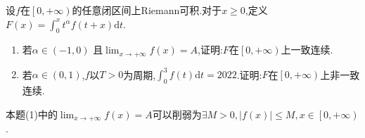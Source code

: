 \documentclass[lang=cn,newtx,10pt,scheme=chinese]{../Template/elegantbook}
\begin{document}
\begin{example}
设$f$在$\left[ 0,+\infty \right)$的任意闭区间上Riemann可积.对于$x\geqslant 0$,定义$F\left( x \right) =\int_0^x{t^{\alpha}}f\left( t+x \right) \mathrm{d}t$.
\begin{enumerate}[(1)]
\item 若$\alpha \in \left( -1,0 \right)$ 且$\lim_{x\rightarrow +\infty} f\left( x \right) =A$,证明:$F$在$\left[ 0,+\infty \right) $上一致连续.

\item 若$\alpha \in \left( 0,1 \right)$,$f$以$T>0$为周期,$\int_0^3{f\left( t \right) \mathrm{d}t}=2022$.证明:$F$在$\left[ 0,+\infty \right) $上非一致连续.
\end{enumerate}
\end{example}
\begin{note}
本题(1)中的$\lim_{x\rightarrow +\infty} f\left( x \right) =A$可以削弱为$\exists M>0,\left| f\left( x \right) \right|\leqslant M,x\in \left[ 0,+\infty \right) $.
\end{note}
\end{document}
